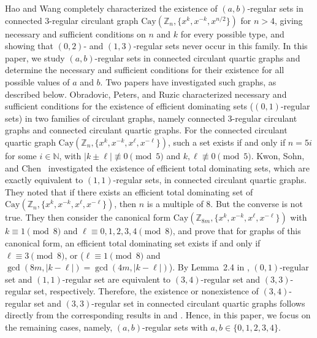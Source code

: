 \documentclass[12pt]{article}
\begin{document}
Hao and Wang \cite{HW} completely characterized the existence of $(a,b)$-regular sets in connected $3$-regular circulant graph $\mathrm{Cay}(\mathbb{Z}_n,\{x^k,x^{-k},x^{n/2}\})$ for $n>4$, giving necessary and sufficient conditions on $n$ and $k$ for every possible type, and showing that $(0,2)$- and $(1,3)$-regular sets never occur in this family. In this paper, we study $(a,b)$-regular sets in connected circulant quartic graphs and determine the necessary and sufficient conditions for their existence for all possible values of $a$ and $b$. Two papers have investigated such graphs, as described below. Obradovic, Peters, and Ruzic \cite{OPR} characterized necessary and sufficient
conditions for the existence of efficient dominating sets ($(0,1)$-regular sets)
in two families of circulant graphs, namely connected $3$-regular circulant graphs and connected circulant quartic graphs.
For the connected circulant quartic  graph
$\mathrm{Cay}(\mathbb{Z}_n,\{x^k,x^{-k},x^{\ell},x^{-\ell}\})$,
such a set exists if and only if $n = 5i$ for some $i \in \mathbb{N}$,
with $|k \pm \ell| \not\equiv 0 \pmod{5}$ and
$k, \ell \not\equiv 0 \pmod{5}$. Kwon, Sohn, and Chen~\cite{KSC} investigated the existence of efficient total dominating sets, which are exactly equivalent to $(1,1)$-regular sets, in connected   circulant quartic graphs. They noted that if there exists an efficient total dominating set of $\mathrm{Cay}(\mathbb{Z}_n,\{x^k,x^{-k},x^\ell,x^{-\ell}\})$, then $n$ is a multiple of $8$. But the converse is not true. They then consider the canonical form $\mathrm{Cay}(\mathbb{Z}_{8m},\{x^k,x^{-k},x^\ell,x^{-\ell}\})$ with $k\equiv1\pmod{8}$ and $\ell\equiv0,1,2,3,4\pmod{8}$, and prove that for graphs of this canonical form, an efficient total dominating set exists if and only if $\ell\equiv3\pmod{8}$, or ($\ell\equiv1\pmod{8}$ and $\gcd(8m,|k-\ell|)=\gcd(4m,|k-\ell|)$). By Lemma~2.4 in \cite{HW}, $(0,1)$-regular set and $(1,1)$-regular set are equivalent to $(3,4)$-regular set and $(3,3)$-regular set, respectively. Therefore, the existence or nonexistence of $(3,4)$-regular set and $(3,3)$-regular set in connected circulant quartic graphs follows directly from the corresponding results in \cite{OPR} and \cite{KSC}. Hence, in this paper, we focus on the remaining cases, namely, $(a,b)$-regular sets with $a,b\in\{0,1,2,3,4\}$.
\end{document}
